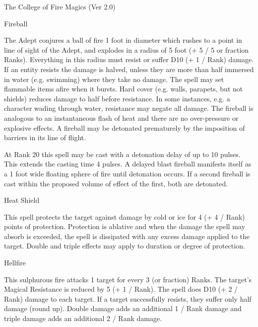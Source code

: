 \begin{Chapter}{The College of Fire Magics (Ver 2.0)}
\begin{spell}[S-4]{Fireball}

\begin{effects}
The Adept conjures a ball of fire 1 foot in diameter which rushes to a
point in line of sight of the Adept, and explodes in a radius of 5
foot (+ 5 / 5 or fraction Ranks). Everything in this radius must
resist or suffer D10 (+ 1 / Rank) damage.  If an entity resists the
damage is halved, unless they are more than half immersed in water
(e.g. swimming) where they take no damage.  The spell may set
flammable items afire when it bursts.  Hard cover (e.g. walls,
parapets, but not shields) reduces damage to half before resistance.
In some instances, e.g.  a character wading through water, resistance
may negate all damage. The fireball is analogous to an instantaneous
flash of heat and there are no over-pressure or explosive effects.  A
fireball may be detonated prematurely by the imposition of barriers in
its line of flight.

At Rank 20 this spell may be cast with a detonation delay of up to 10
pulses.  This extends the casting time 4 pulses.  A delayed blast
fireball manifests itself as a 1 foot wide floating sphere of fire
until detonation occurs. If a second fireball is cast within the
proposed volume of effect of the first, both are detonated.
\end{effects}
\end{spell}

\begin{spell}[S-5]{Heat Shield}

\begin{effects}
This spell protects the target against damage by cold or ice for 4 (+
4 / Rank) points of protection.  Protection is ablative and when the
damage the spell may absorb is exceeded, the spell is dissipated with
any excess damage applied to the target. Double and triple effects may
apply to duration or degree of protection.
\end{effects}
\end{spell}

\begin{spell}[S-6]{Hellfire}

\begin{effects}
This sulphurous fire attacks 1 target for every 3 (or fraction) Ranks.
The target’s Magical Resistance is reduced by 5 (+ 1 / Rank). The
spell does D10 (+ 2 / Rank) damage to each target.  If a target
successfully resists, they suffer only half damage (round up).  Double
damage adds an additional 1 / Rank damage and triple damage adds an
additional 2 / Rank damage.
\end{effects}
\end{spell}


\end{Chapter}
